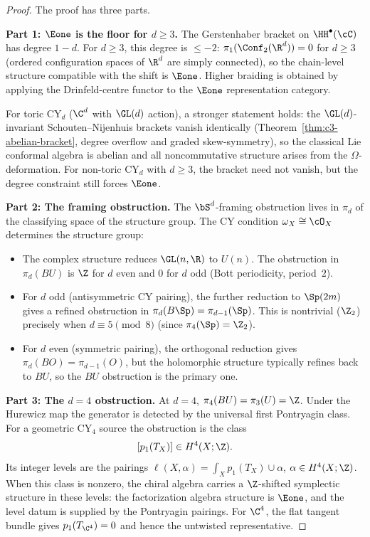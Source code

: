 \begin{proof}
 The proof has three parts.

\medskip
\noindent\textbf{Part 1: $\Eone$ is the floor for $d \geq 3$.}
The Gerstenhaber bracket on $\HH^\bullet(\cC)$ has degree $1 - d$.
For $d \geq 3$, this degree is $\leq -2$: $\pi_1(\Conf_2(\R^d)) = 0$
for $d \geq 3$ (ordered configuration spaces of $\R^d$ are
simply connected), so the chain-level structure compatible with the
shift is $\Eone$. Higher braiding is obtained by applying the
Drinfeld-centre functor to the $\Eone$ representation category.

For toric CY$_d$ ($\C^d$ with $\GL(d)$ action), a stronger statement holds: the $\GL(d)$-invariant Schouten--Nijenhuis brackets vanish identically (Theorem~\ref{thm:c3-abelian-bracket}, degree overflow and graded skew-symmetry), so the classical Lie conformal algebra is abelian and all noncommutative structure arises from the $\Omega$-deformation. For non-toric CY$_d$ with $d \geq 3$, the bracket need not vanish, but the degree constraint still forces $\Eone$.

\medskip
\noindent\textbf{Part 2: The framing obstruction.}
The $\bS^d$-framing obstruction lives in $\pi_d$ of the classifying space of the structure group. The CY condition $\omega_X \cong \cO_X$ determines the structure group:
\begin{itemize}
 \item The complex structure reduces $\GL(n, \R)$ to $U(n)$. The obstruction in $\pi_d(BU)$ is $\Z$ for $d$ even and $0$ for $d$ odd (Bott periodicity, period~$2$).
 \item For $d$ odd (antisymmetric CY pairing), the further reduction to $\Sp(2m)$ gives a refined obstruction in $\pi_d(B\Sp) = \pi_{d-1}(\Sp)$. This is nontrivial ($\Z_2$) precisely when $d \equiv 5 \pmod{8}$ (since $\pi_4(\Sp) = \Z_2$).
 \item For $d$ even (symmetric pairing), the orthogonal reduction gives $\pi_d(BO) = \pi_{d-1}(O)$, but the holomorphic structure typically refines back to $BU$, so the $BU$ obstruction is the primary one.
\end{itemize}

\medskip
\noindent\textbf{Part 3: The $d = 4$ obstruction.}
At $d = 4$, $\pi_4(BU) = \pi_3(U) = \Z$. Under the Hurewicz map the generator is detected by the universal first Pontryagin class. For a geometric CY$_4$ source the obstruction is the class
\[
 [p_1(T_X)] \in H^4(X;\Z).
\]
Its integer levels are the pairings
\(\ell(X,\alpha)=\int_X p_1(T_X)\cup\alpha\), \(\alpha\in H^4(X;\Z)\).
When this class is nonzero, the chiral algebra carries a $\Z$-shifted symplectic structure in these levels: the factorization algebra structure is $\Eone$, and the level datum is supplied by the Pontryagin pairings. For $\C^4$, the flat tangent bundle gives $p_1(T_{\C^4})=0$ and hence the untwisted representative.
\end{proof}


